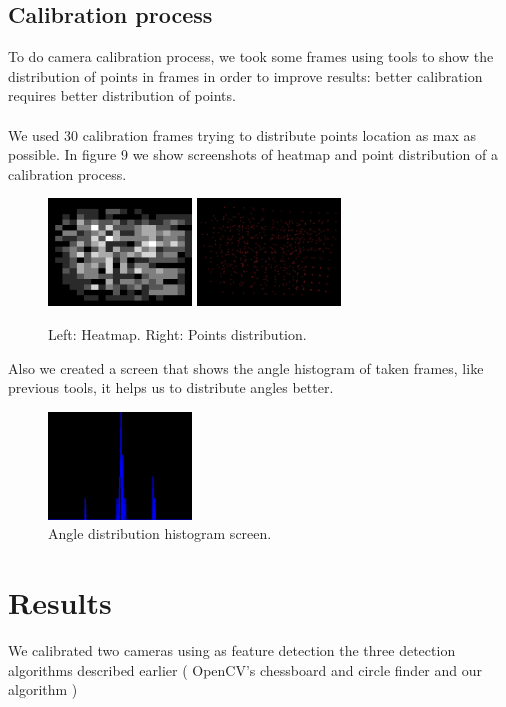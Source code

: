 \documentclass[journal]{IEEEtran}
\begin{document}
\subsection{Calibration process}
To do camera calibration process, we took some frames using tools to show the distribution of points in frames in order to improve results: better calibration requires better distribution of points.
\\
\\
We used 30 calibration frames trying to distribute points location as max as possible. In figure 9 we show screenshots of heatmap and point distribution of a calibration process.

\begin{figure}[H]
\centering
\includegraphics[width=1.5in]{_img/img_report3_heatmap.png}
\includegraphics[width=1.5in]{_img/img_report3_points_distribution.png}
\caption{Left: Heatmap. Right: Points distribution.}
\end{figure}

Also we created a screen that shows the angle histogram of taken frames, like previous tools, it helps us to distribute angles better.
\begin{figure}[H]
\centering
\includegraphics[width=1.5in]{_img/img_report3_angle_histogram.png}
\caption{Angle distribution histogram screen.}
\end{figure}

\section{Results}
We calibrated two cameras using as feature detection the three detection algorithms described earlier ( OpenCV's chessboard and circle finder and our algorithm )
\end{document}
